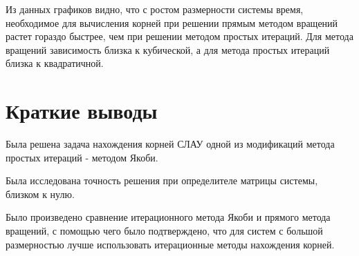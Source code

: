 Из данных графиков видно, что с ростом размерности системы время, необходимое для вычисления корней при решении прямым методом вращений растет гораздо быстрее, чем при решении методом простых итераций. Для метода вращений зависимость близка к кубической, а для метода простых итераций близка к квадратичной. 

\section{Краткие выводы}

Была решена задача нахождения корней СЛАУ одной из модификаций метода простых итераций - методом Якоби.

Была исследована точность решения при определителе матрицы системы, близком к нулю.

Было произведено сравнение итерационного метода Якоби и прямого метода вращений, с помощью чего было подтверждено, что для систем с большой размерностью лучше использовать итерационные методы нахождения корней.



